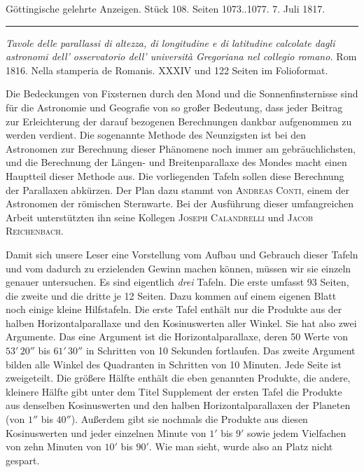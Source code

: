 \clearpage
{}
\hypertarget{native-604-lower}{}
\begin{center}\small Göttingische gelehrte Anzeigen. Stück 108. Seiten 1073..1077. 7. Juli 1817.\\[3pt]\rule{.72\linewidth}{.3pt}\end{center}

\emph{Tavole delle parallassi di altezza, di longitudine e di latitudine calcolate dagli astronomi dell' osservatorio dell' università Gregoriana nel collegio romano.} Rom 1816. Nella stamperia de Romanis. XXXIV und 122 Seiten im Folioformat.

\begingroup{}\relax
Die Bedeckungen von Fixsternen durch den Mond und die Sonnenfinsternisse sind für die Astronomie und Geografie von so großer Bedeutung, dass jeder Beitrag zur Erleichterung der darauf bezogenen Berechnungen dankbar aufgenommen zu werden verdient. Die sogenannte Methode des Neunzigsten ist bei den Astronomen zur Berechnung dieser Phänomene noch immer am gebräuchlichsten, und die Berechnung der Längen- und Breitenparallaxe des Mondes macht einen Hauptteil dieser Methode aus. Die vorliegenden Tafeln sollen diese Berechnung der Parallaxen abkürzen. Der Plan dazu stammt von \textsc{Andreas Conti}, einem der Astronomen der römischen Sternwarte. Bei der Ausführung dieser umfangreichen Arbeit unterstützten ihn seine Kollegen \textsc{Joseph Calandrelli} und \textsc{Jacob Reichenbach}.

Damit sich unsere Leser eine Vorstellung vom Aufbau und Gebrauch dieser Tafeln und vom dadurch zu erzielenden Gewinn machen können, müssen wir sie einzeln genauer untersuchen. Es sind eigentlich \emph{drei} Tafeln. Die erste umfasst 93 Seiten, die zweite und die dritte je 12 Seiten. Dazu kommen auf einem eigenen Blatt noch einige kleine Hilfstafeln. Die erste Tafel enthält nur die Produkte aus der halben Horizontalparallaxe und den Kosinuswerten aller Winkel. Sie hat also zwei Argumente. Das eine Argument ist die Horizontalparallaxe, deren 50 Werte von $53'\,20''$ bis $61'\,30''$ in Schritten von 10 Sekunden fortlaufen. Das zweite Argument bilden alle Winkel des Quadranten in Schritten von 10 Minuten. Jede Seite ist zweigeteilt. Die größere Hälfte enthält die eben genannten Produkte, die andere, kleinere Hälfte gibt unter dem Titel Supplement der ersten Tafel die Produkte aus denselben Kosinuswerten und den halben Horizontalparallaxen der Planeten (von $1''$ bis $40''$). Außerdem gibt sie nochmals die Produkte aus diesen Kosinuswerten und jeder einzelnen Minute von $1'$ bis $9'$ sowie jedem Vielfachen von zehn Minuten von $10'$ bis $90'$. Wie man sieht, wurde also an Platz nicht gespart.

